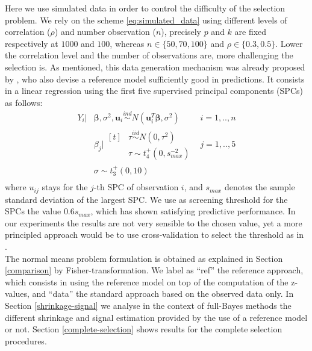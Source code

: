 \documentclass[american,]{article}
\theoremstyle{definition}
\begin{document}
Here we use simulated data in order to control the difficulty of the selection problem. We rely on the scheme \eqref{eq:simulated_data} using different levels of correlation ($\rho$) and number observation ($n$), precisely $p$ and $k$ are fixed respectively at $1000$ and $100$, whereas $n\in\{50,70,100\}$ and $\rho\in\{0.3,0.5\}$. Lower the correlation level and the number of observations are, more challenging the selection is. As mentioned, this data generation mechanism was already proposed by \cite{paper:projpred}, who also devise a reference model sufficiently good in predictions. It consists in a linear regression using the first five supervised principal components (SPCs) \citep{bair2006prediction, piironen2018} as follows:
\
\begin{equation}
\label{eq:ref_mod}
\begin{aligned}
    Y_{i}|&\boldsymbol{\beta},\sigma^{2},\boldsymbol{u}_{i} \overset{ind}{\sim} N(\boldsymbol{u}_{i}^{T}\boldsymbol{\beta},\sigma^{2}) \quad &i=1,..,n \\
    &\beta_{j}|\!\begin{aligned}[t] &\tau \overset{iid}{\sim} N(0,\tau^{2})\\
    &\tau \sim t_{4}^{+}(0,s_{max}^{-2}) 
    \end{aligned} &j=1,..,5 \\ 
    &\sigma \sim t_{3}^{+}(0,10) \\
\end{aligned}
\end{equation}
where $u_{ij}$ stays for the $j$-th SPC of observation $i$, and $s_{max}$ denotes the sample standard deviation of the largest SPC. We use as screening threshold for the SPCs the value $0.6s_{max}$, which has shown satisfying predictive performance. In our experiments the results are not very sensible to the chosen value, yet a more principled approach would be to use cross-validation to select the threshold as in \cite{paper:projpred}.
\\
The normal means problem formulation is obtained as explained in Section \ref{comparison} by Fisher-transformation. We label as ``ref'' the reference approach, which consists in using the reference model on top of the computation of the z-values, and ``data'' the standard approach based on the observed data only. In Section \ref{shrinkage-signal} we analyse in the context of full-Bayes methods the different shrinkage and signal estimation provided by the use of a reference model or not. Section \ref{complete-selection} shows results for the complete selection procedures.
\end{document}
